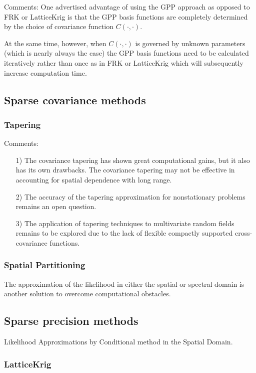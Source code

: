 \documentclass[
12pt, %
a4paper, %
oneside, %
headinclude,footinclude, %
BCOR5mm, %
]{scrartcl}
\begin{document}
\textcolor[rgb]{1.00,0.00,1.00}{Comments:}
One advertised advantage of using the GPP approach as opposed to FRK or LatticeKrig is that the GPP basis functions are completely determined by the choice of covariance function $C(\cdot, \cdot)$.

At the same time, however, when $C(\cdot, \cdot)$ is governed by unknown parameters (which is nearly always the case) the GPP basis functions need to be calculated iteratively rather than once as in FRK or LatticeKrig which will subsequently increase computation time.


\subsection{Sparse covariance methods}
\subsubsection{Tapering}
\textcolor[rgb]{1.00,0.00,1.00}{Comments:}
\begin{itemize}
  \item [1)]
  The covariance tapering has shown great computational gains, but it also has its own drawbacks. The covariance tapering may not be effective in accounting for spatial dependence with long range.

 \item [2)]The accuracy of the tapering approximation for nonstationary problems remains an open question.

 \item [3)]The application of tapering techniques to multivariate random fields remains to be explored due to the lack of flexible compactly supported cross-covariance functions.
\end{itemize}
\subsubsection{Spatial Partitioning}


The approximation of the likelihood in either the spatial or spectral domain is another solution to overcome computational obstacles.
\subsection{Sparse precision methods}
Likelihood Approximations by Conditional method in the Spatial Domain.
\subsubsection{LatticeKrig}
\end{document}
